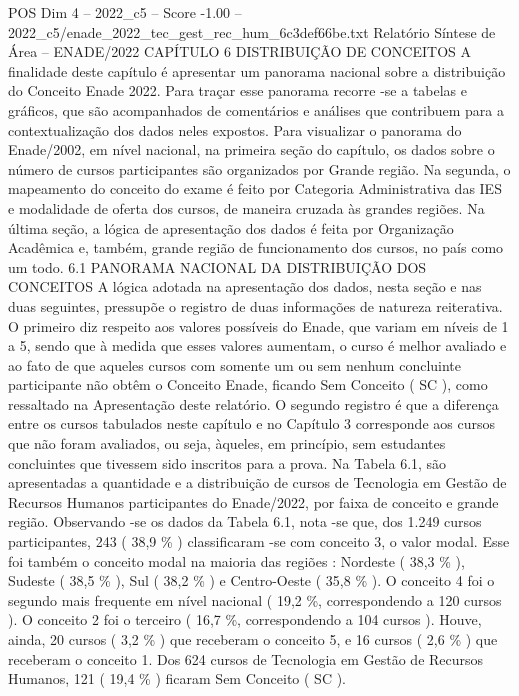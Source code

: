 \begin{textsample}{POS Dim 4 – 2022\_c5 – Score -1.00 – 2022\_c5/enade\_2022\_tec\_gest\_rec\_hum\_6c3def66be.txt}  \label{ex:f4_pos_284}
Relatório Síntese de Área – ENADE/2022 CAPÍTULO 6 DISTRIBUIÇÃO DE CONCEITOS A finalidade deste capítulo é apresentar um panorama nacional sobre a distribuição do Conceito Enade 2022.
Para traçar esse panorama recorre -se a tabelas e gráficos, que são acompanhados de comentários e análises que contribuem para a contextualização dos dados neles expostos.
Para visualizar o panorama do Enade/2002, em nível nacional, na primeira seção do capítulo, os dados sobre o número de cursos participantes são organizados por Grande região.
Na segunda, o mapeamento do conceito do exame é feito por Categoria Administrativa das IES e modalidade de oferta dos cursos, de maneira cruzada às grandes regiões.
Na última seção, a lógica de apresentação dos dados é feita por Organização Acadêmica e, também, grande região de funcionamento dos cursos, no país como um todo. 6.1 PANORAMA NACIONAL DA DISTRIBUIÇÃO DOS CONCEITOS A lógica adotada na apresentação dos dados, nesta seção e nas duas seguintes, pressupõe o registro de duas informações de natureza reiterativa.
O primeiro diz respeito aos valores possíveis do Enade, que variam em níveis de 1 a 5, sendo que à medida que esses valores aumentam, o curso é melhor avaliado e ao fato de que aqueles cursos com somente um ou sem nenhum concluinte participante não obtêm o Conceito Enade, ficando Sem Conceito ( SC ), como ressaltado na Apresentação deste relatório.
O segundo registro é que a diferença entre os cursos tabulados neste capítulo e no Capítulo 3 corresponde aos cursos que não foram avaliados, ou seja, àqueles, em princípio, sem estudantes concluintes que tivessem sido inscritos para a prova.
Na Tabela 6.1, são apresentadas a quantidade e a distribuição de cursos de Tecnologia em Gestão de Recursos Humanos participantes do Enade/2022, por faixa de conceito e grande região.
Observando -se os dados da Tabela 6.1, nota -se que, dos 1.249 cursos participantes, 243 ( 38,9 \% ) classificaram -se com conceito 3, o valor modal.
Esse foi também o conceito modal na maioria das regiões : Nordeste ( 38,3 \% ), Sudeste ( 38,5 \% ), Sul ( 38,2 \% ) e Centro-Oeste ( 35,8 \% ).
O conceito 4 foi o segundo mais frequente em nível nacional ( 19,2 \%, correspondendo a 120 cursos ).
O conceito 2 foi o terceiro ( 16,7 \%, correspondendo a 104 cursos ).
Houve, ainda, 20 cursos ( 3,2 \% ) que receberam o conceito 5, e 16 cursos ( 2,6 \% ) que receberam o conceito 1.
Dos 624 cursos de Tecnologia em Gestão de Recursos Humanos, 121 ( 19,4 \% ) ficaram Sem Conceito ( SC ).

\end{textsample}
